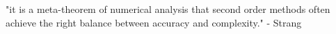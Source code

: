 \documentclass[preview]{standalone}
\begin{document}
\begin{center}
"it is a meta-theorem of numerical analysis that second order methods often achieve the right balance between accuracy and complexity." - Strang
\end{center}
\end{document}
